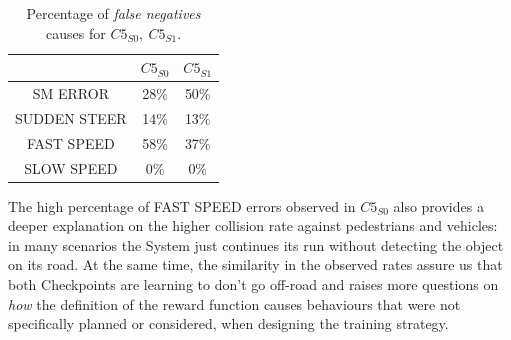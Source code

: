 \begin{table}
	\begin{center}
		\begin{tabular}{ |c|c|c| }
			\hline
			& $C5_{S0}$ & $C5_{S1}$ \\
			\hline
			SM ERROR & 28\% & 50\% \\
			\hline
			SUDDEN STEER & 14\% & 13\% \\
			\hline
			FAST SPEED & 58\% & 37\% \\
			\hline
			SLOW SPEED & 0\% & 0\% \\
			\hline
		\end{tabular}
	\caption{Percentage of \textsl{false negatives} causes for $C5_{S0},\: C5_{S1}$.}
	\end{center}
\end{table}

The high percentage of FAST SPEED errors observed in $C5_{S0}$ also provides a deeper explanation on the higher collision rate against pedestrians and vehicles: in many scenarios the System just continues its run without detecting the object on its road. At the same time, the similarity in the observed rates assure us that both Checkpoints are learning to don't go off-road and raises more questions on \textsl{how} the definition of the reward function causes behaviours that were not specifically planned or considered, when designing the training strategy.
